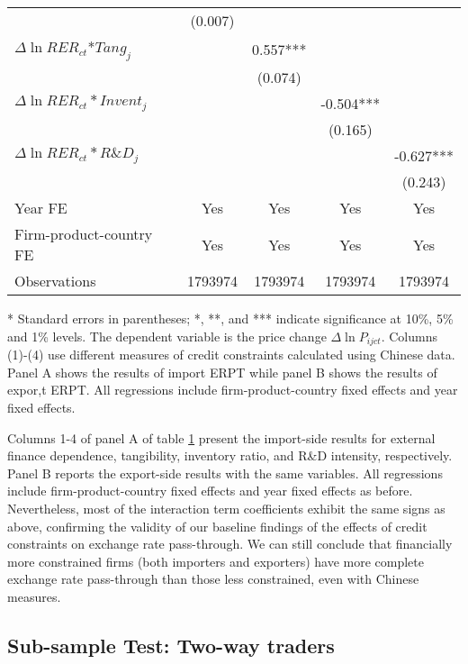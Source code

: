 \documentclass[12pt]{article}
\begin{document}
\begin{table}[htbp]
\begin{threeparttable}
\begin{tabular}{lcccc}
		& (0.007) &       &       &  \\
		$\Delta \ln RER_{ct}$*$Tang_{j}$ &       & 0.557*** &       &  \\
		&       & (0.074) &       &  \\
		$\Delta \ln RER_{ct}*Invent_{j}$ &       &       & -0.504*** &  \\
		&       &       & (0.165) &  \\
		$\Delta \ln RER_{ct}*R\&D_{j}$ &       &       &       & -0.627*** \\
		&       &       &       & (0.243) \\
		Year FE  & Yes   & Yes   & Yes   & Yes \\
		Firm-product-country FE & Yes   & Yes   & Yes   & Yes \\
		Observations & 1793974 & 1793974 & 1793974 & 1793974 \\
		\bottomrule
	\end{tabular}
	\begin{tablenotes}
		\footnotesize
		\item[*]  Standard errors in parentheses; *, **, and *** indicate significance at 10\%, 5\% and 1\% levels. The dependent variable is the price change $\Delta \ln P_{ijct}$. Columns (1)-(4) use different measures of credit constraints calculated using Chinese data. Panel A shows the results of import ERPT while panel B shows the results of expor,t ERPT. All regressions include firm-product-country fixed effects and year fixed effects.
	\end{tablenotes}
	\end{threeparttable}
        \label{tab.alt.credit}
\end{table}

Columns 1-4 of panel A of table \ref{tab.alt.credit} present the import-side results for external finance dependence, tangibility, inventory ratio, and R\&D intensity, respectively. Panel B reports the export-side results with the same variables. All regressions include firm-product-country fixed effects and year fixed effects as before. Nevertheless, most of the interaction term coefficients exhibit the same signs as above, confirming the validity of our baseline findings of the effects of credit constraints on exchange rate pass-through. We can still conclude that financially more constrained firms (both importers and exporters) have more complete exchange rate pass-through than those less constrained, even with Chinese measures.

\subsection{Sub-sample Test: Two-way traders}
\end{document}
